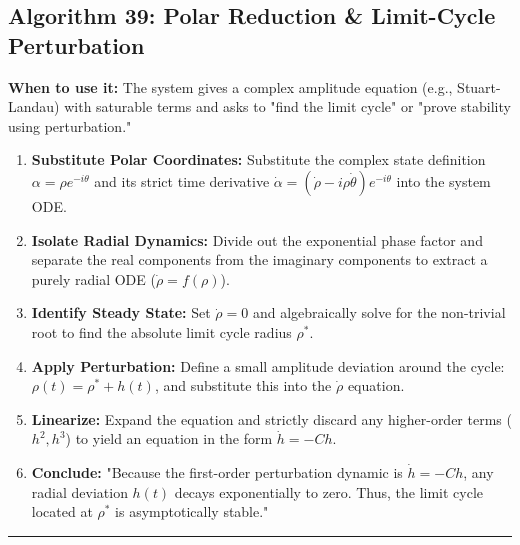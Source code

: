 \documentclass[11pt, a4paper]{report}
\begin{document}
\subsection*{Algorithm 39: Polar Reduction \& Limit-Cycle Perturbation}
\textbf{When to use it:} The system gives a complex amplitude equation (e.g., Stuart-Landau) with saturable terms and asks to "find the limit cycle" or "prove stability using perturbation."
\begin{enumerate}[label=\textbf{\arabic*.}]
    \item \textbf{Substitute Polar Coordinates:} Substitute the complex state definition $\alpha = \rho e^{-i\theta}$ and its strict time derivative $\dot{\alpha} = (\dot{\rho} - i\rho\dot{\theta})e^{-i\theta}$ into the system ODE.
    \item \textbf{Isolate Radial Dynamics:} Divide out the exponential phase factor and separate the real components from the imaginary components to extract a purely radial ODE ($\dot{\rho} = f(\rho)$).
    \item \textbf{Identify Steady State:} Set $\dot{\rho} = 0$ and algebraically solve for the non-trivial root to find the absolute limit cycle radius $\rho^*$.
    \item \textbf{Apply Perturbation:} Define a small amplitude deviation around the cycle: $\rho(t) = \rho^* + h(t)$, and substitute this into the $\dot{\rho}$ equation.
    \item \textbf{Linearize:} Expand the equation and strictly discard any higher-order terms ($h^2, h^3$) to yield an equation in the form $\dot{h} = -C h$.
    \item \textbf{Conclude:} "Because the first-order perturbation dynamic is $\dot{h} = -C h$, any radial deviation $h(t)$ decays exponentially to zero. Thus, the limit cycle located at $\rho^*$ is asymptotically stable."
\end{enumerate}
\vspace{1em}
\noindent\rule{\textwidth}{0.4pt}
\vspace{1em}
\end{document}
